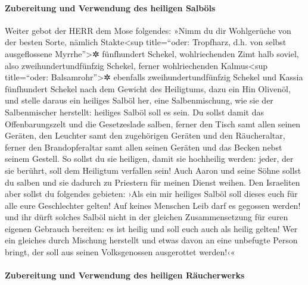 \hypertarget{zubereitung-und-verwendung-des-heiligen-salbuxf6ls}{%
\paragraph{Zubereitung und Verwendung des heiligen
Salböls}\label{zubereitung-und-verwendung-des-heiligen-salbuxf6ls}}

 Weiter gebot der HERR dem Mose folgendes:
 »Nimm du dir Wohlgerüche von der besten Sorte, nämlich
Stakte\textless sup title=``oder: Tropfharz, d.h. von selbst
ausgeflossene Myrrhe''\textgreater✲ fünfhundert Schekel, wohlriechenden
Zimt halb soviel, also zweihundertundfünfzig Schekel, ferner
wohlriechenden Kalmus\textless sup title=``oder:
Balsamrohr''\textgreater✲ ebenfalls zweihundertundfünfzig Schekel
 und Kassia fünfhundert Schekel nach dem Gewicht des
Heiligtums, dazu ein Hin Olivenöl,  und stelle daraus ein
heiliges Salböl her, eine Salbenmischung, wie sie der Salbenmischer
herstellt: heiliges Salböl soll es sein.  Du sollst damit
das Offenbarungszelt und die Gesetzeslade salben,  ferner
den Tisch samt allen seinen Geräten, den Leuchter samt den zugehörigen
Geräten und den Räucheraltar,  ferner den Brandopferaltar
samt allen seinen Geräten und das Becken nebst seinem Gestell.
 So sollst du sie heiligen, damit sie hochheilig werden:
jeder, der sie berührt, soll dem Heiligtum verfallen sein!
 Auch Aaron und seine Söhne sollst du salben und sie
dadurch zu Priestern für meinen Dienst weihen.  Den
Israeliten aber sollst du folgendes gebieten: ›Als ein mir heiliges
Salböl soll dieses euch für alle eure Geschlechter gelten!
 Auf keines Menschen Leib darf es gegossen werden! und
ihr dürft solches Salböl nicht in der gleichen Zusammensetzung für euren
eigenen Gebrauch bereiten: es ist heilig und soll euch auch als heilig
gelten!  Wer ein gleiches durch Mischung herstellt und
etwas davon an eine unbefugte Person bringt, der soll aus seinen
Volksgenossen ausgerottet werden!‹«

\hypertarget{zubereitung-und-verwendung-des-heiligen-ruxe4ucherwerks}{%
\paragraph{Zubereitung und Verwendung des heiligen
Räucherwerks}\label{zubereitung-und-verwendung-des-heiligen-ruxe4ucherwerks}}


